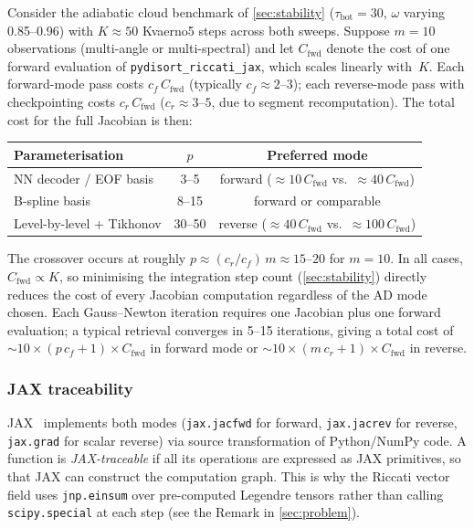 \documentclass[11pt,a4paper]{article}
\newcommand{\tbot}{\tau_{\mathrm{bot}}}
\theoremstyle{definition}
\begin{document}
Consider the adiabatic cloud benchmark of \cref{sec:stability}
($\tbot = 30$, $\omega$ varying 0.85--0.96) with $K \approx 50$
Kvaerno5 steps across both sweeps.  Suppose $m = 10$ observations
(multi-angle or multi-spectral) and let $C_{\mathrm{fwd}}$ denote the
cost of one forward evaluation of \texttt{pydisort\_riccati\_jax},
which scales linearly with~$K$.  Each forward-mode pass costs
$c_f \, C_{\mathrm{fwd}}$ (typically $c_f \approx 2$--$3$); each
reverse-mode pass with checkpointing costs
$c_r \, C_{\mathrm{fwd}}$ ($c_r \approx 3$--$5$, due to segment
recomputation).  The total cost for the full Jacobian is then:
\begin{center}
\begin{tabular}{lcc}
\toprule
Parameterisation & $p$ & Preferred mode \\
\midrule
NN decoder / EOF basis  & 3--5   & forward ($\approx 10\,C_{\mathrm{fwd}}$
                                      vs.\ $\approx 40\,C_{\mathrm{fwd}}$) \\
B-spline basis          & 8--15  & forward or comparable \\
Level-by-level + Tikhonov & 30--50 & reverse ($\approx 40\,C_{\mathrm{fwd}}$
                                      vs.\ $\approx 100\,C_{\mathrm{fwd}}$) \\
\bottomrule
\end{tabular}
\end{center}
The crossover occurs at roughly $p \approx (c_r / c_f)\, m \approx
15$--$20$ for $m = 10$.  In all cases, $C_{\mathrm{fwd}} \propto K$,
so minimising the integration step count (\cref{sec:stability})
directly reduces the cost of every Jacobian computation regardless of
the AD mode chosen.  Each Gauss--Newton iteration requires one Jacobian
plus one forward evaluation; a typical retrieval converges in 5--15
iterations, giving a total cost of $\sim\!10 \times (p\,c_f + 1)
\times C_{\mathrm{fwd}}$ in forward mode or
$\sim\!10 \times (m\,c_r + 1) \times C_{\mathrm{fwd}}$ in reverse.

\subsubsection{JAX traceability}

JAX~\cite{jax2018github} implements both modes (\texttt{jax.jacfwd} for
forward, \texttt{jax.jacrev} for reverse, \texttt{jax.grad} for scalar
reverse) via source transformation of Python/NumPy code.  A function is
\emph{JAX-traceable} if all its operations are expressed as JAX
primitives, so that JAX can construct the computation graph.  This is
why the Riccati vector field uses \texttt{jnp.einsum} over pre-computed
Legendre tensors rather than calling \texttt{scipy.special} at each
step (see the Remark in \cref{sec:problem}).
\end{document}
